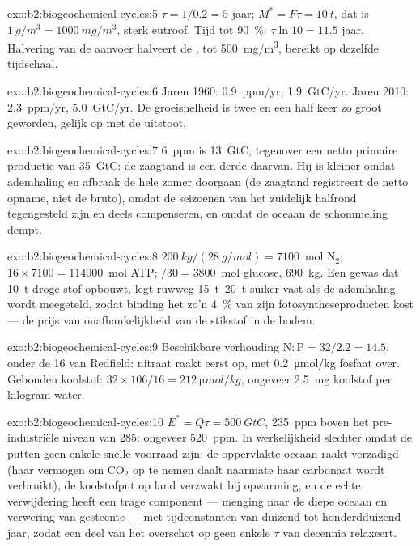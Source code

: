 \begin{solution}{exo:b2:biogeochemical-cycles:5}
$\tau = 1/0.2 = 5$ jaar; $M^{*} = F\tau = \qty{10}{t}$, dat is
$\qty{1}{g/m^3} = \qty{1000}{mg/m^3}$, sterk eutroof. Tijd tot
\qty{90}{\%}: $\tau\ln 10 = 11.5$ jaar. Halvering van de aanvoer halveert
de , tot \qty{500}{mg/m^3}, bereikt op dezelfde
tijdschaal.
\end{solution}

\begin{solution}{exo:b2:biogeochemical-cycles:6}
Jaren 1960: \qty{0.9}{ppm/yr}, \qty{1.9}{GtC/yr}. Jaren 2010: \qty{2.3}{ppm/yr},
\qty{5.0}{GtC/yr}. De groeisnelheid is twee en een half keer zo groot
geworden, gelijk op met de uitstoot.
\end{solution}

\begin{solution}{exo:b2:biogeochemical-cycles:7}
\qty{6}{ppm} is \qty{13}{GtC}, tegenover een netto primaire productie van
\qty{35}{GtC}: de zaagtand is een derde daarvan. Hij is kleiner omdat
ademhaling en afbraak de hele zomer doorgaan (de zaagtand registreert de netto
opname, niet de bruto), omdat de seizoenen van het zuidelijk halfrond
tegengesteld zijn en deels compenseren, en omdat de oceaan de schommeling
dempt.
\end{solution}

\begin{solution}{exo:b2:biogeochemical-cycles:8}
$\qty{200}{kg}/(\qty{28}{g/mol}) = 7100$~mol $\mathrm{N_2}$; $16\times
7100 = \num{114000}$~mol ATP; $/30 = 3800$~mol glucose, \qty{690}{kg}.
Een gewas dat \qty{10}{t} droge stof opbouwt, legt ruwweg
\qtyrange{15}{20}{t} suiker vast als de ademhaling wordt meegeteld, zodat
binding het zo'n \qty{4}{\%} van zijn fotosyntheseproducten kost --- de
prijs van onafhankelijkheid van de stikstof in de bodem.
\end{solution}

\begin{solution}{exo:b2:biogeochemical-cycles:9}
Beschikbare verhouding $\mathrm{N:P} = 32/2.2 = 14.5$, onder de 16 van
Redfield: nitraat raakt eerst op, met \qty{0.2}{\micro mol/kg}
fosfaat over. Gebonden koolstof: $32\times 106/16 =
\qty{212}{\micro mol/kg}$, ongeveer \qty{2.5}{mg} koolstof per
kilogram water.
\end{solution}

\begin{solution}{exo:b2:biogeochemical-cycles:10}
$E^{*} = Q\tau = \qty{500}{GtC}$, \qty{235}{ppm} boven het
pre-industriële niveau van 285: ongeveer \qty{520}{ppm}. In werkelijkheid
slechter omdat de putten geen enkele snelle voorraad zijn: de oppervlakte-oceaan
raakt verzadigd (haar vermogen om $\mathrm{CO_2}$ op te nemen daalt naarmate haar
carbonaat wordt verbruikt), de koolstofput op land verzwakt bij opwarming, en
de echte verwijdering heeft een trage component --- menging naar de diepe
oceaan en verwering van gesteente --- met tijdconstanten van duizend tot
honderdduizend jaar, zodat een deel van het overschot op geen enkele $\tau$ van
decennia relaxeert.
\end{solution}

